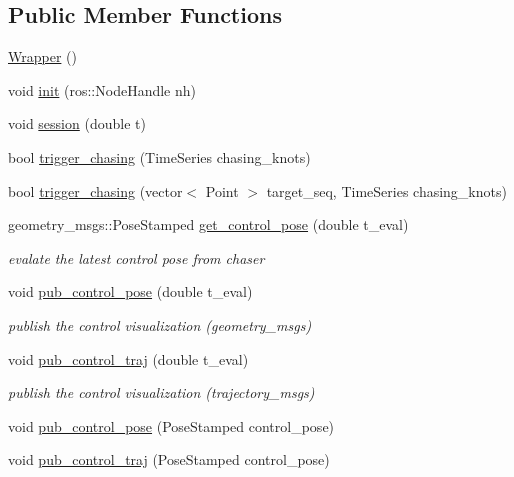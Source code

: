 \subsection*{Public Member Functions}
\begin{DoxyCompactItemize}
\item 
\hyperlink{class_wrapper_aa40ce9fcba8ab60bf01bcb0913144b4a}{Wrapper} ()
\item 
void \hyperlink{class_wrapper_af336781e7d75d525e7b152366a0e0d93}{init} (ros\+::\+Node\+Handle nh)
\item 
void \hyperlink{class_wrapper_a009ee5c325926f92df42319d5469a376}{session} (double t)
\item 
bool \hyperlink{class_wrapper_a21a0e115ea80e053e4f2defd1362b92f}{trigger\+\_\+chasing} (Time\+Series chasing\+\_\+knots)
\item 
bool \hyperlink{class_wrapper_a2da6448c77dd4edb054de4130b1fc883}{trigger\+\_\+chasing} (vector$<$ Point $>$ target\+\_\+seq, Time\+Series chasing\+\_\+knots)
\item 
geometry\+\_\+msgs\+::\+Pose\+Stamped \hyperlink{class_wrapper_ac2338df9e7b31f3291ed1cbd137a6f14}{get\+\_\+control\+\_\+pose} (double t\+\_\+eval)
\begin{DoxyCompactList}\small\item\em evalate the latest control pose from chaser \end{DoxyCompactList}\item 
void \hyperlink{class_wrapper_a94a786272ea8120469cb476d021c5b76}{pub\+\_\+control\+\_\+pose} (double t\+\_\+eval)
\begin{DoxyCompactList}\small\item\em publish the control visualization (geometry\+\_\+msgs) \end{DoxyCompactList}\item 
void \hyperlink{class_wrapper_a7f0e09c8a675991a3c987e41c6b9ff9d}{pub\+\_\+control\+\_\+traj} (double t\+\_\+eval)
\begin{DoxyCompactList}\small\item\em publish the control visualization (trajectory\+\_\+msgs) \end{DoxyCompactList}\item 
void \hyperlink{class_wrapper_a3fcc1a8192f2e72f501f2e9912a0ef41}{pub\+\_\+control\+\_\+pose} (Pose\+Stamped control\+\_\+pose)
\item 
void \hyperlink{class_wrapper_a754999f67924fbda6dc3b3e38377af79}{pub\+\_\+control\+\_\+traj} (Pose\+Stamped control\+\_\+pose)
\end{DoxyCompactItemize}
